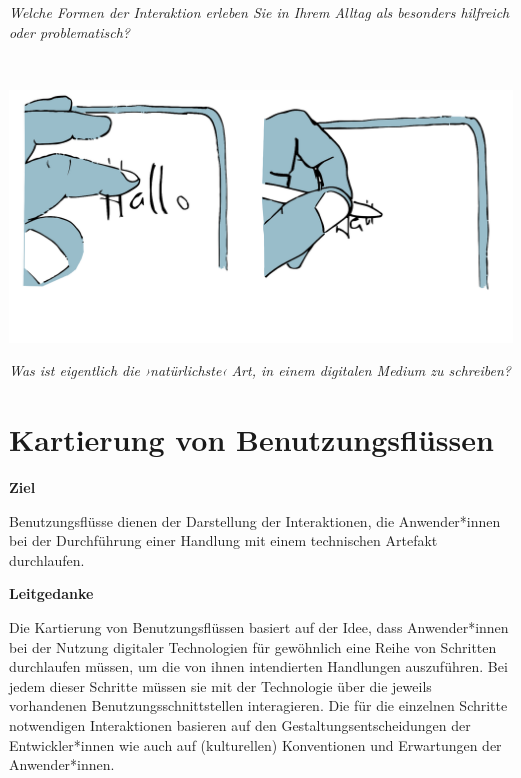 \documentclass[
  a4paper,
]{book}
\begin{document}
\begin{blackbox}
\emph{Welche Formen der Interaktion erleben Sie in Ihrem Alltag als besonders hilfreich oder problematisch?}

\end{blackbox}

~

\begin{center}\includegraphics{Figures/11-03-Diskussionspunkt} \end{center}

\begin{blackbox}
\emph{Was ist eigentlich die ›natürlichste‹ Art, in einem digitalen Medium zu schreiben?}

\end{blackbox}

\section{Kartierung von Benutzungsflüssen}\label{kartierung-von-benutzungsfluxfcssen}

\textbf{Ziel}

Benutzungsflüsse dienen der Darstellung der Interaktionen, die Anwender*innen bei der Durchführung einer Handlung mit einem technischen Artefakt durchlaufen.

\textbf{Leitgedanke}

Die Kartierung von Benutzungsflüssen basiert auf der Idee, dass Anwender*innen bei der Nutzung digitaler Technologien für gewöhnlich eine Reihe von Schritten durchlaufen müssen, um die von ihnen intendierten Handlungen auszuführen. Bei jedem dieser Schritte müssen sie mit der Technologie über die jeweils vorhandenen Benutzungsschnittstellen interagieren. Die für die einzelnen Schritte notwendigen Interaktionen basieren auf den Gestaltungsentscheidungen der Entwickler*innen wie auch auf (kulturellen) Konventionen und Erwartungen der Anwender*innen.
\end{document}
